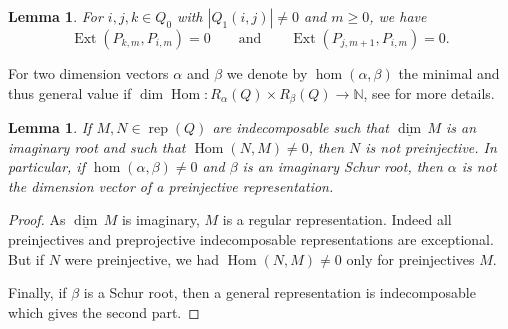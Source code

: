 \documentclass{amsart}
\newtheorem{lemma}[theorem]{Lemma}
\numberwithin{equation}{section}
\newcommand{\NN}{\mathbb{N}}
\newcommand\udim{{\underline{\dim}\, }}
\newcommand{\Ext}{\operatorname{Ext}}
\newcommand{\Hom}{\operatorname{Hom}}
\newcommand{\rep}{\operatorname{rep}}
\begin{document}
\begin{lemma}
  \label{le:preprojective ext groups}
  For $i,j,k\in Q_0$ with $|Q_1(i,j)|\ne0$ and $m\ge0$, we have 
  \[\Ext(P_{k,m},P_{i,m})=0 \qquad \text{and} \qquad \Ext(P_{j,m+1},P_{i,m})=0.\]
\end{lemma}
For two dimension vectors $\alpha$ and $\beta$ we denote by $\hom(\alpha,\beta)$ the minimal and thus general value if $\dim\Hom:R_\alpha(Q)\times R_\beta(Q)\to \NN$, see \cite{sch} for more details.
\begin{lemma}
  \label{lem: non-preinjective}
  If $M,N\in\rep(Q)$ are indecomposable such that $\udim M$ is an imaginary root and such that $\Hom(N,M)\neq 0$, then $N$ is not preinjective.
  In particular, if $\hom(\alpha,\beta)\neq 0$ and $\beta$ is an imaginary Schur root, then $\alpha$ is not the dimension vector of a preinjective representation.
\end{lemma}
\begin{proof}
  As $\udim M$ is imaginary, $M$ is a regular representation.
  Indeed all preinjectives and preprojective indecomposable representations are exceptional.
  But if $N$ were preinjective, we had $\Hom(N,M)\neq 0$ only for preinjectives $M$.

  Finally, if $\beta$ is a Schur root, then a general representation is indecomposable which gives the second part.
\end{proof}
\end{document}
